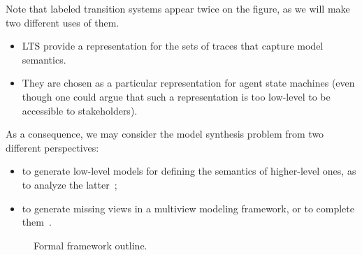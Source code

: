 Note that labeled transition systems appear twice on the figure, as we will make two different uses of them. 

\begin{itemize} 
\item LTS provide a representation for the sets of traces that capture model semantics. 
\item They are chosen as a particular representation for agent state machines (even though one could argue that such a representation is too low-level to be accessible to stakeholders).
\end{itemize}

As a consequence, we may consider the model synthesis problem from two different perspectives:

\begin{itemize}
\item to generate low-level models for defining the semantics of higher-level ones, as to analyze the latter~\cite{Magee:1997, Uchitel:2003, Damas:2009};
\item to generate missing views in a multiview modeling framework, or to complete them~\cite{VanLamsweerde:1998, Whittle:2000, Uchitel:2004, Damas:2005}.
\end{itemize}

\begin{figure}[t]\centering
  \caption{Formal framework outline.\label{image:framework}}
\end{figure}



